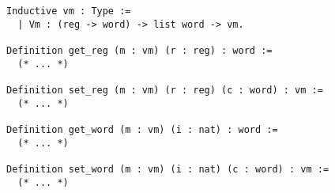 
\begin{lstlisting}[style=Rocq]
Inductive vm : Type :=
  | Vm : (reg -> word) -> list word -> vm.

Definition get_reg (m : vm) (r : reg) : word :=
  (* ... *)

Definition set_reg (m : vm) (r : reg) (c : word) : vm :=
  (* ... *)

Definition get_word (m : vm) (i : nat) : word :=
  (* ... *)

Definition set_word (m : vm) (i : nat) (c : word) : vm :=
  (* ... *)
\end{lstlisting}



